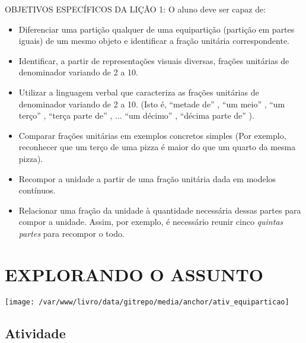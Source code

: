 \documentclass[a4paper,12pt,twoside]{book}
\begin{document}
\begin{professor*}[breakable]{}{}
  OBJETIVOS ESPECÍFICOS DA LIÇÃO 1:  
  O aluno deve ser capaz de:  
\begin{itemize} %
    \item       Diferenciar uma partição qualquer de uma equipartição (partição em partes iguais) de um mesmo objeto e identificar a fração unitária correspondente.
    \item       Identificar, a partir de representações visuais diversas, frações unitárias de denominador variando de 2 a 10. 
    \item       Utilizar a linguagem verbal que caracteriza as frações unitárias de denominador variando de 2 a 10. (Isto é,       ``metade de''      ,       ``um meio''      ,       ``um terço''      ,       ``terça parte de''      , ...       ``um décimo''      ,       ``décima parte de''      ).
    \item       Comparar frações unitárias em exemplos concretos simples (Por exemplo, reconhecer que um terço de uma pizza é maior do que um quarto da mesma pizza).
    \item       Recompor a unidade a partir de uma fração unitária dada em modelos contínuos. 
    \item       Relacionar uma fração da unidade à quantidade necessária dessas partes para compor a unidade. Assim, por exemplo, é necessário reunir cinco       {\it quintas partes}       para recompor o todo.  
\end{itemize} %
  
\end{professor*}






\chapter{ EXPLORANDO O ASSUNTO }


\texttt{[image: /var/www/livro/data/gitrepo/media/anchor/ativ\_equiparticao]}
\section{Atividade}
\end{document}
